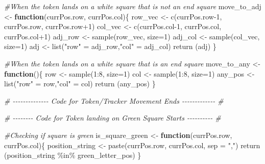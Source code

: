 \documentclass[
]{article}
\newenvironment{Shaded}{\begin{snugshade}}{\end{snugshade}}
\newcommand{\AttributeTok}[1]{\textcolor[rgb]{0.77,0.63,0.00}{#1}}
\newcommand{\CommentTok}[1]{\textcolor[rgb]{0.56,0.35,0.01}{\textit{#1}}}
\newcommand{\ControlFlowTok}[1]{\textcolor[rgb]{0.13,0.29,0.53}{\textbf{#1}}}
\newcommand{\DecValTok}[1]{\textcolor[rgb]{0.00,0.00,0.81}{#1}}
\newcommand{\FunctionTok}[1]{\textcolor[rgb]{0.00,0.00,0.00}{#1}}
\newcommand{\NormalTok}[1]{#1}
\newcommand{\OtherTok}[1]{\textcolor[rgb]{0.56,0.35,0.01}{#1}}
\newcommand{\SpecialCharTok}[1]{\textcolor[rgb]{0.00,0.00,0.00}{#1}}
\newcommand{\StringTok}[1]{\textcolor[rgb]{0.31,0.60,0.02}{#1}}
\begin{document}
\begin{Shaded}
\begin{Highlighting}[]
\CommentTok{\#When the token lands on a white square that is not an end square}
\NormalTok{move\_to\_adj }\OtherTok{\textless{}{-}} \ControlFlowTok{function}\NormalTok{(currPos.row, currPos.col)\{}
\NormalTok{  row\_vec }\OtherTok{\textless{}{-}} \FunctionTok{c}\NormalTok{(currPos.row}\DecValTok{{-}1}\NormalTok{, currPos.row, currPos.row}\SpecialCharTok{+}\DecValTok{1}\NormalTok{)}
\NormalTok{  col\_vec }\OtherTok{\textless{}{-}} \FunctionTok{c}\NormalTok{(currPos.col}\DecValTok{{-}1}\NormalTok{, currPos.col, currPos.col}\SpecialCharTok{+}\DecValTok{1}\NormalTok{)}
\NormalTok{  adj\_row }\OtherTok{\textless{}{-}} \FunctionTok{sample}\NormalTok{(row\_vec, }\AttributeTok{size=}\DecValTok{1}\NormalTok{)}
\NormalTok{  adj\_col }\OtherTok{\textless{}{-}} \FunctionTok{sample}\NormalTok{(col\_vec, }\AttributeTok{size=}\DecValTok{1}\NormalTok{)}
\NormalTok{  adj }\OtherTok{\textless{}{-}} \FunctionTok{list}\NormalTok{(}\StringTok{"row"} \OtherTok{=}\NormalTok{ adj\_row,}\StringTok{"col"} \OtherTok{=}\NormalTok{ adj\_col)}
  \FunctionTok{return}\NormalTok{ (adj)}
\NormalTok{\}}

\CommentTok{\#When the token lands on a white square that is an end square}
\NormalTok{move\_to\_any }\OtherTok{\textless{}{-}} \ControlFlowTok{function}\NormalTok{()\{}
\NormalTok{  row }\OtherTok{\textless{}{-}} \FunctionTok{sample}\NormalTok{(}\DecValTok{1}\SpecialCharTok{:}\DecValTok{8}\NormalTok{, }\AttributeTok{size=}\DecValTok{1}\NormalTok{)}
\NormalTok{  col }\OtherTok{\textless{}{-}} \FunctionTok{sample}\NormalTok{(}\DecValTok{1}\SpecialCharTok{:}\DecValTok{8}\NormalTok{, }\AttributeTok{size=}\DecValTok{1}\NormalTok{)}
\NormalTok{  any\_pos }\OtherTok{\textless{}{-}} \FunctionTok{list}\NormalTok{(}\StringTok{"row"} \OtherTok{=}\NormalTok{ row,}\StringTok{"col"} \OtherTok{=}\NormalTok{ col)}
  \FunctionTok{return}\NormalTok{ (any\_pos)}
\NormalTok{\}}

\CommentTok{\# {-}{-}{-}{-}{-}{-}{-}{-}{-}{-}{-}{-}{-}{-} Code for Token/Tracker Movement Ends {-}{-}{-}{-}{-}{-}{-}{-}{-}{-}{-}{-}{-} \#}




\CommentTok{\# {-}{-}{-}{-}{-}{-}{-}{-} Code for Token landing on Green Square Starts {-}{-}{-}{-}{-}{-}{-}{-}{-}{-} \#}

\CommentTok{\#Checking if square is green}
\NormalTok{is\_square\_green }\OtherTok{\textless{}{-}} \ControlFlowTok{function}\NormalTok{(currPos.row, currPos.col)\{}
\NormalTok{  position\_string }\OtherTok{\textless{}{-}} \FunctionTok{paste}\NormalTok{(currPos.row, currPos.col, }\AttributeTok{sep =} \StringTok{","}\NormalTok{)}
  \FunctionTok{return}\NormalTok{ (position\_string }\SpecialCharTok{\%in\%}\NormalTok{ green\_letter\_pos)}
\NormalTok{\}}


\end{Highlighting}
\end{Shaded}
\end{document}
